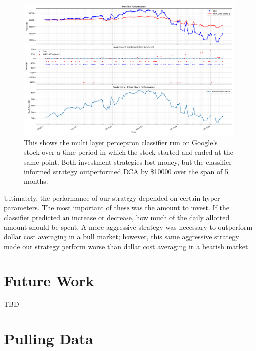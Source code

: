 \documentclass[12pt]{article}
\begin{document}
\begin{figure}
	\centering
	\includegraphics[width=0.7\linewidth]{../Results/GOOG-DCA-MLPCLASS-2013-12-02--2014-05-12-alphas--[1]-train_length--1-performanceplot}
	\caption{This shows the multi layer perceptron classifier run on Google's stock over a time period in which the stock started and ended at the same point. Both investment strategies lost money, but the classifier-informed strategy outperformed DCA by \$10000 over the span of 5 months.}
	\label{class-steady}
\end{figure}


Ultimately, the performance of our strategy depended on certain hyper-parameters. The most important of these was the amount to invest. If the classifier predicted an increase or decrease, how much of the daily allotted amount should be spent. A more aggressive strategy was necessary to outperform dollar cost averaging in a bull market; however, this same aggressive strategy made our strategy perform worse than dollar cost averaging in a bearish market.

\section{Future Work}
TBD

\newpage
\appendix

\section{Pulling Data}


\end{document}
